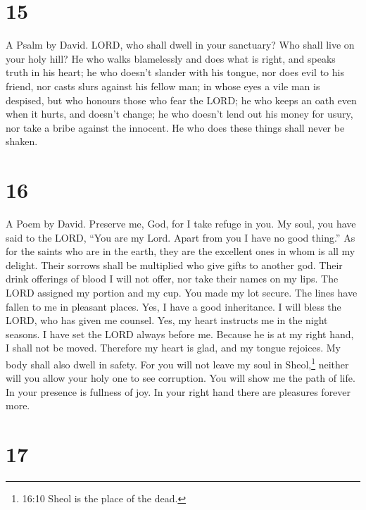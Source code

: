 \hypertarget{section-14}{%
\section{15}\label{section-14}}

A Psalm by David.  LORD, who shall dwell in your sanctuary?
Who shall live on your holy hill?  He who walks blamelessly
and does what is right, and speaks truth in his heart;  he
who doesn't slander with his tongue, nor does evil to his friend, nor
casts slurs against his fellow man;  in whose eyes a vile
man is despised, but who honours those who fear the LORD; he who keeps
an oath even when it hurts, and doesn't change;  he who
doesn't lend out his money for usury, nor take a bribe against the
innocent. He who does these things shall never be shaken.

\hypertarget{section-15}{%
\section{16}\label{section-15}}

A Poem by David.  Preserve me, God, for I take refuge in
you.  My soul, you have said to the LORD, ``You are my Lord.
Apart from you I have no good thing.''  As for the saints
who are in the earth, they are the excellent ones in whom is all my
delight.  Their sorrows shall be multiplied who give gifts
to another god. Their drink offerings of blood I will not offer, nor
take their names on my lips.  The LORD assigned my portion
and my cup. You made my lot secure.  The lines have fallen
to me in pleasant places. Yes, I have a good inheritance.  I
will bless the LORD, who has given me counsel. Yes, my heart instructs
me in the night seasons.  I have set the LORD always before
me. Because he is at my right hand, I shall not be moved. 
Therefore my heart is glad, and my tongue rejoices. My body shall also
dwell in safety.  For you will not leave my soul in
Sheol,\footnote{16:10 Sheol is the place of the dead.} neither will you
allow your holy one to see corruption.  You will show me
the path of life. In your presence is fullness of joy. In your right
hand there are pleasures forever more.

\hypertarget{section-16}{%
\section{17}\label{section-16}}

